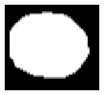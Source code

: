 \begin{frame}
\begin{columns}[b,onlytextwidth]
\begin{column}{.25\textwidth}
\begin{figure}[t]
\end{figure}
\end{column}
\begin{column}{.25\textwidth}
\begin{figure}[t]
\centering
\includegraphics[height=1.5in]{../../Figures/gac/dcm_out.eps}
\end{figure}
\end{column}
\end{columns}
\end{frame} 

